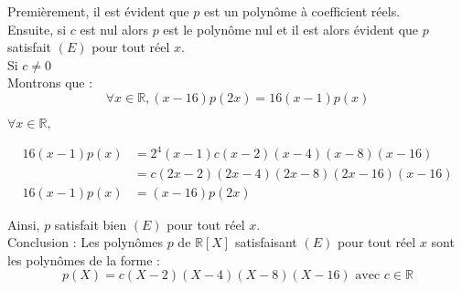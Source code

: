 \documentclass[paper=a4, fontsize=11pt]{scrartcl} %
\numberwithin{equation}{section} %
\numberwithin{figure}{section} %
\numberwithin{table}{section} %
\begin{document}
Premièrement, il est évident que $p$ est un polynôme à coefficient réels.\\

Ensuite, si $c$ est nul alors $p$ est le polynôme nul et il est alors évident que $p$ satisfait $(E)$ pour tout réel $x$.\\

Si $c \neq 0$\\

Montrons que : $$\forall x \in \mathbb{R}, (x - 16)p(2x) = 16(x - 1)p(x)$$

$\forall x \in \mathbb{R},$

\begin{equation}
\begin{split}
16(x - 1)p(x) &= 2^{4}(x - 1)c(x-2)(x-4)(x-8)(x-16)\\\
&= c(2x - 2)(2x-4)(2x-8)(2x-16)(x-16)\\
16(x - 1)p(x) &= (x - 16)p(2x)
\end{split}
\end{equation}

Ainsi, $p$ satisfait bien $(E)$ pour tout réel $x$.\\

Conclusion : Les polynômes $p$ de $\mathbb{R}[X]$ satisfaisant $(E)$ pour tout réel $x$ sont les polynômes de la forme : $$p(X) = c(X-2)(X-4)(X-8)(X-16) \text{ avec } c \in \mathbb{R}$$
\end{document}
